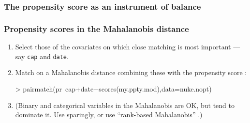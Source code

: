 \begin{frame} \enlargethispage*{400pt}
\frametitle{The propensity score as an instrument of balance}
\begin{center}
\end{center}
\end{frame}


\begin{frame}[fragile]
  \frametitle{Propensity scores in the Mahalanobis distance}

  \begin{enumerate}
 \item Select those of the covariates on which close matching is most
    important --- say \texttt{cap} and \texttt{date}.  
  \item Match on a Mahalanobis distance combining these with the
    propensity score \citep{rosenbaum:rubi:1985a,rubin:thom:2000}: %
\begin{Schunk}
\begin{Sinput}
> pairmatch(pr~cap+date+scores(my.ppty.mod),data=nuke.nopt)
\end{Sinput}
\end{Schunk}
\item 
  (Binary and categorical variables in the Mahalanobis are OK, but tend to dominate it.  Use sparingly, or use ``rank-based Mahalanobis'' \citep{rosenbaum2010design}.)
  \end{enumerate}

\end{frame}

